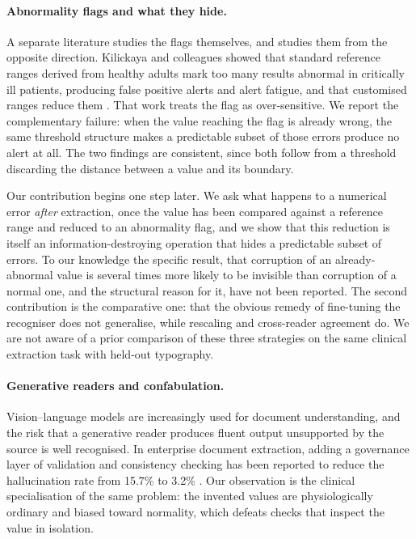 \documentclass[11pt]{article}
\begin{document}
\paragraph{Abnormality flags and what they hide.}
A separate literature studies the flags themselves, and studies them from the opposite
direction. Kilickaya and colleagues showed that standard reference ranges derived from healthy
adults mark too many results abnormal in critically ill patients, producing false positive
alerts and alert fatigue, and that customised ranges reduce them \citep{kilickaya2014ranges}.
That work treats the flag as over-sensitive. We report the complementary failure: when the
value reaching the flag is already wrong, the same threshold structure makes a predictable
subset of those errors produce no alert at all. The two findings are consistent, since both
follow from a threshold discarding the distance between a value and its boundary.

Our contribution begins one step later. We ask what happens to a numerical error \emph{after}
extraction, once the value has been compared against a reference range and reduced to an
abnormality flag, and we show that this reduction is itself an information-destroying operation
that hides a predictable subset of errors. To our knowledge the specific result, that
corruption of an already-abnormal value is several times more likely to be invisible than
corruption of a normal one, and the structural reason for it, have not been reported. The
second contribution is the comparative one: that the obvious remedy of fine-tuning the
recogniser does not generalise, while rescaling and cross-reader agreement do. We are not aware
of a prior comparison of these three strategies on the same clinical extraction task with
held-out typography.

\paragraph{Generative readers and confabulation.}
Vision--language models are increasingly used for document understanding, and the risk that a
generative reader produces fluent output unsupported by the source is well recognised. In
enterprise document extraction, adding a governance layer of validation and consistency checking
has been reported to reduce the hallucination rate from 15.7\% to 3.2\%
\citep{sediqin2026sage}. Our observation is the clinical specialisation of the same problem: the
invented values are physiologically ordinary and biased toward normality, which defeats checks
that inspect the value in isolation.
\end{document}
